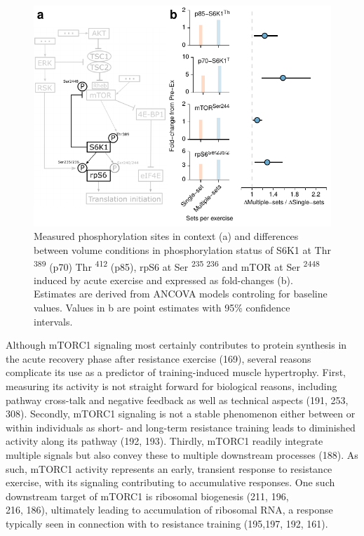 \documentclass[twoside,10pt]{gihclass} %
\begin{document}
\begin{figure}

{\centering \includegraphics{thesis_files/figure-latex/mtor-fig-1} 

}

\caption[Differences between volume conditions in exercise induced phosphorylation of proteins related to mTORC1 signaling]{Measured phosphorylation sites in context (a) and differences between volume conditions in phosphorylation status of S6K1 at Thr \textsuperscript{389} (p70) Thr \textsuperscript{412} (p85), rpS6 at Ser \textsuperscript{235 236} and mTOR at Ser \textsuperscript{2448} induced by acute exercise and expressed as fold-changes (b). Estimates are derived from ANCOVA models controling for baseline values. Values in b are point estimates with 95\% confidence intervals.}\label{fig:mtor-fig}
\end{figure}
Although mTORC1 signaling most certainly contributes to protein synthesis in the acute recovery phase after resistance exercise (169),
several reasons complicate its use as a predictor of training-induced muscle hypertrophy.
First, measuring its activity is not straight forward for biological reasons, including pathway cross-talk and negative feedback as well as technical aspects
(191, 253, 308).
Secondly, mTORC1 signaling is not a stable phenomenon either between or within individuals as short- and long-term resistance training leads to diminished activity along its pathway
(192, 193).
Thirdly, mTORC1 readily integrate multiple signals but also convey these to multiple downstream processes
(188).
As such, mTORC1 activity represents an early, transient response to resistance exercise, with its signaling contributing to accumulative responses.
One such downstream target of mTORC1 is ribosomal biogenesis
(211, 196,\\
216, 186),
ultimately leading to accumulation of ribosomal RNA, a response typically seen in connection with to resistance training
(195,197, 192, 161).
\end{document}
